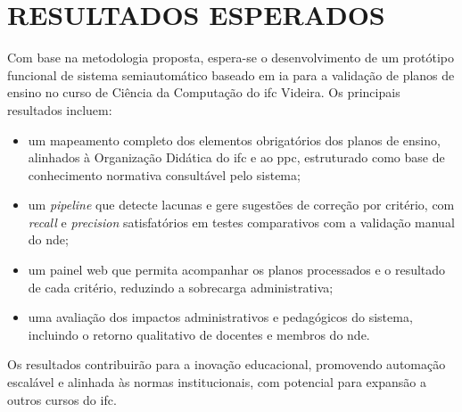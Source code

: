 \chapter{RESULTADOS ESPERADOS}

Com base na metodologia proposta, espera-se o desenvolvimento de um protótipo funcional de sistema semiautomático baseado em \gls{ia} para a validação de planos de ensino no curso de Ciência da Computação do \gls{ifc} Videira. Os principais resultados incluem:
\begin{itemize}
\item um mapeamento completo dos elementos obrigatórios dos planos de ensino, alinhados à Organização Didática do \gls{ifc} e ao \gls{ppc}, estruturado como base de conhecimento normativa consultável pelo sistema;
\item um \textit{pipeline} que detecte lacunas e gere sugestões de correção por critério, com \textit{recall} e \textit{precision} satisfatórios em testes comparativos com a validação manual do \gls{nde};
\item um painel web que permita acompanhar os planos processados e o resultado de cada critério, reduzindo a sobrecarga administrativa;
\item uma avaliação dos impactos administrativos e pedagógicos do sistema, incluindo o retorno qualitativo de docentes e membros do \gls{nde}.
\end{itemize}

Os resultados contribuirão para a inovação educacional, promovendo automação escalável e alinhada às normas institucionais, com potencial para expansão a outros cursos do \gls{ifc}.
